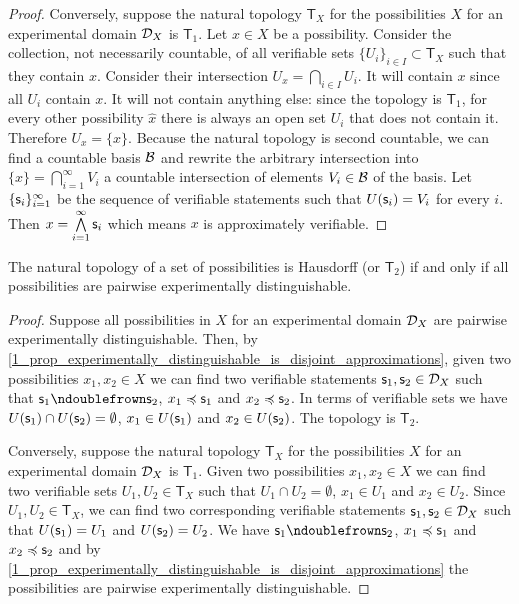 \documentclass[11pt,letterpaper,fleqn]{memoir} %
\begin{document}
\begin{mathSection}
\begin{proof}
	Conversely, suppose the natural topology $\mathsf{T}_X$ for the possibilities $X$ for an experimental domain $\mathcal{D}_X$ is $\mathsf{T}_1$. Let $x \in X$ be a possibility. Consider the collection, not necessarily countable, of all verifiable sets $\{U_i\}_{i \in I} \subset \mathsf{T}_X$ such that they contain $x$. Consider their intersection $U_x = \bigcap\limits_{i \in I} U_i$. It will contain $x$ since all $U_i$ contain $x$. It will not contain anything else: since the topology is $\mathsf{T}_1$, for every other possibility $\hat{x}$ there is always an open set $U_i$ that does not contain it. Therefore $U_x = \{x\}$. Because the natural topology is second countable, we can find a countable basis $\mathcal{B}$ and rewrite the arbitrary intersection into $\{x\} = \bigcap\limits_{i=1}^\infty V_i$ a countable intersection of elements $V_i \in \mathcal{B}$ of the basis. Let $\{\mathsf{s}_i\}_{i=1}^\infty$ be the sequence of verifiable statements such that $U(\mathsf{s}_i) = V_i$ for every $i$. Then $x=\bigwedge\limits_{i=1}^\infty \mathsf{s}_i$ which means $x$ is approximately verifiable.

\end{proof}
\begin{prop}
	The natural topology of a set of possibilities is Hausdorff (or $\mathsf{T}_2$) if and only if all possibilities are pairwise experimentally distinguishable.
\end{prop}
\begin{proof}
	Suppose all possibilities in $X$ for an experimental domain $\mathcal{D}_X$ are pairwise experimentally distinguishable. Then, by \ref{1_prop_experimentally_distinguishable_is_disjoint_approximations}, given two possibilities $x_1, x_2 \in X$ we can find two verifiable statements $\mathsf{s}_1, \mathsf{s}_2 \in \mathcal{D}_X$ such that $\stmt_1 \ncomp \stmt_2$, $x_1 \preccurlyeq \mathsf{s}_1$ and $x_2 \preccurlyeq \mathsf{s}_2$. In terms of verifiable sets we have $U(\mathsf{s}_1) \cap U(\mathsf{s}_2) = \emptyset$, $x_1 \in U(\mathsf{s}_1)$ and $x_2 \in U(\mathsf{s}_2)$. The topology is $\mathsf{T}_2$.
	
	Conversely, suppose the natural topology $\mathsf{T}_X$ for the possibilities $X$ for an experimental domain $\mathcal{D}_X$ is $\mathsf{T}_1$. Given two possibilities $x_1, x_2 \in X$ we can find two verifiable sets $U_1, U_2 \in \mathsf{T}_X$ such that $U_1 \cap U_2 = \emptyset$, $x_1 \in U_1$ and $x_2 \in U_2$. Since $U_1, U_2 \in \mathsf{T}_X$, we can find two corresponding verifiable statements $\mathsf{s}_1, \mathsf{s}_2 \in \mathcal{D}_X$ such that $U(\mathsf{s}_1) = U_1$ and $U(\mathsf{s}_2) = U_2$. We have $\stmt_1 \ncomp \stmt_2$, $x_1 \preccurlyeq \mathsf{s}_1$ and $x_2 \preccurlyeq \mathsf{s}_2$ and by \ref{1_prop_experimentally_distinguishable_is_disjoint_approximations} the possibilities are pairwise experimentally distinguishable.
\end{proof}
\end{mathSection}
\end{document}
